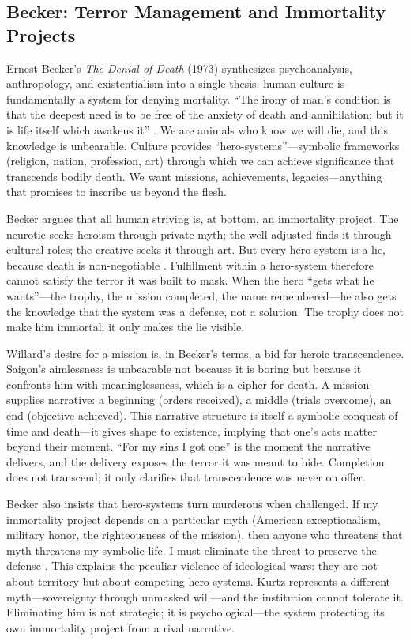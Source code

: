 \subsection*{Becker: Terror Management and Immortality Projects}
\label{ssec:vi-becker}

Ernest Becker's \textit{The Denial of Death} (1973) synthesizes psychoanalysis, anthropology,
and existentialism into a single thesis: human culture is fundamentally a system for denying
mortality. ``The irony of man's condition is that the deepest need is to be free of the
anxiety of death and annihilation; but it is life itself which awakens it''
\parencite[p.~66]{BeckerDenial1973}. We are animals who know we will die, and this knowledge
is unbearable. Culture provides ``hero-systems''---symbolic frameworks (religion, nation,
profession, art) through which we can achieve significance that transcends bodily death. We
want missions, achievements, legacies---anything that promises to inscribe us beyond the flesh.

Becker argues that all human striving is, at bottom, an immortality project. The neurotic
seeks heroism through private myth; the well-adjusted finds it through cultural roles; the
creative seeks it through art. But every hero-system is a lie, because death is non-negotiable
\parencite[pp.~26--27]{BeckerDenial1973}. Fulfillment within a hero-system therefore cannot
satisfy the terror it was built to mask. When the hero ``gets what he wants''---the trophy,
the mission completed, the name remembered---he also gets the knowledge that the system was a
defense, not a solution. The trophy does not make him immortal; it only makes the lie visible.

Willard's desire for a mission is, in Becker's terms, a bid for heroic transcendence. Saigon's
aimlessness is unbearable not because it is boring but because it confronts him with
meaninglessness, which is a cipher for death. A mission supplies narrative: a beginning
(orders received), a middle (trials overcome), an end (objective achieved). This narrative
structure is itself a symbolic conquest of time and death---it gives shape to existence,
implying that one's acts matter beyond their moment. ``For my sins I got one'' is the moment
the narrative delivers, and the delivery exposes the terror it was meant to hide. Completion
does not transcend; it only clarifies that transcendence was never on offer.

Becker also insists that hero-systems turn murderous when challenged. If my immortality
project depends on a particular myth (American exceptionalism, military honor, the righteousness
of the mission), then anyone who threatens that myth threatens my symbolic life. I must
eliminate the threat to preserve the defense \parencite[pp.~123--125]{BeckerDenial1973}. This
explains the peculiar violence of ideological wars: they are not about territory but about
competing hero-systems. Kurtz represents a different myth---sovereignty through unmasked
will---and the institution cannot tolerate it. Eliminating him is not strategic; it is
psychological---the system protecting its own immortality project from a rival narrative.

